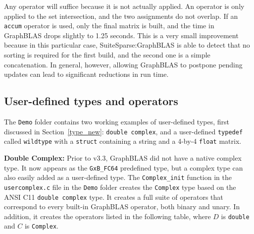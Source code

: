 \documentclass[12pt]{article}
\begin{document}
{Any operator will suffice because it is not actually applied.  An operator is
only applied to the set intersection, and the two assignments do not overlap.
If an \verb'accum' operator is used, only the final matrix is built, and the
time in GraphBLAS drops slightly to 1.25 seconds.  This is a very small
improvement because in this particular case, SuiteSparse:GraphBLAS is able to
detect that no sorting is required for the first build, and the second one is a
simple concatenation.  In general, however, allowing GraphBLAS to postpone
pending updates can lead to significant reductions in run time.

\subsection{User-defined types and operators}
\label{user}

The \verb'Demo' folder contains two working examples of user-defined types,
first discussed in Section~\ref{type_new}: \verb'double complex', and a
user-defined \verb'typedef' called \verb'wildtype' with a \verb'struct'
containing a string and a 4-by-4 \verb'float' matrix.

{\bf Double Complex:}
Prior to v3.3, GraphBLAS did not have a native complex type.  It now appears as
the \verb'GxB_FC64' predefined type, but a complex type can also easily added
as a user-defined type.  The \verb'Complex_init' function in the
\verb'usercomplex.c' file in the \verb'Demo' folder creates the \verb'Complex'
type based on the ANSI C11 \verb'double complex' type.
It creates a full suite of operators that correspond to every
built-in GraphBLAS operator, both binary and unary.  In addition, it
creates the operators listed in the following table, where $D$ is
\verb'double' and $C$ is \verb'Complex'.

}
\end{document}
